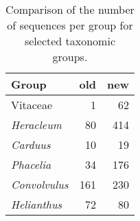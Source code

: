 \documentclass{article}
\begin{document}
\begin{longtabu}{XRR}
\caption{Comparison of the number of sequences per group for selected taxonomic groups.}\\
\toprule
Group & old & new \\
\midrule
\endhead
Vitaceae & 1 & 62 \\
\textit{Heracleum} & 80 & 414 \\
\textit{Carduus} & 10 & 19 \\
\textit{Phacelia} & 34 & 176 \\
\textit{Convolvulus} & 161 & 230 \\
\textit{Helianthus} & 72 & 80 \\
\bottomrule
\end{longtabu}
\end{document}
